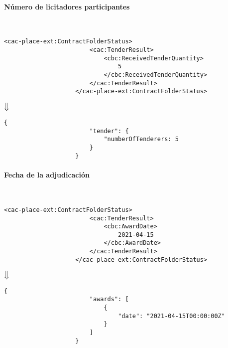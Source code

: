             \paragraph{Número de licitadores participantes} \mbox{}\\
                \begin{lstlisting}[language=lXML]
                    <cac-place-ext:ContractFolderStatus>
                        <cac:TenderResult>
                            <cbc:ReceivedTenderQuantity>
                                5
                            </cbc:ReceivedTenderQuantity>
                        </cac:TenderResult>
                    </cac-place-ext:ContractFolderStatus>
                \end{lstlisting}
                
                \begin{center}
                    $\big\Downarrow$
                \end{center}
                
                \begin{lstlisting}[language=lJSON]
                    {
                        "tender": {
                            "numberOfTenderers: 5
                        }
                    }
                \end{lstlisting}
                
            \paragraph{Fecha de la adjudicación} \mbox{}\\
                \begin{lstlisting}[language=lXML]
                    <cac-place-ext:ContractFolderStatus>
                        <cac:TenderResult>
                            <cbc:AwardDate>
                                2021-04-15
                            </cbc:AwardDate>
                        </cac:TenderResult>
                    </cac-place-ext:ContractFolderStatus>
                \end{lstlisting}
                
                \begin{center}
                    $\big\Downarrow$
                \end{center}
\newpage
                \begin{lstlisting}[language=lJSON]
                    {
                        "awards": [
                            {
                                "date": "2021-04-15T00:00:00Z"
                            }
                        ]
                    }
                \end{lstlisting}
                
